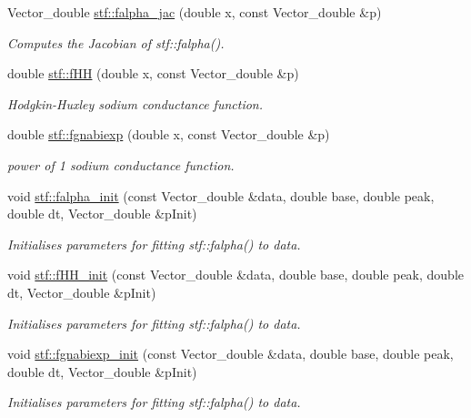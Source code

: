 \begin{DoxyCompactItemize}
Vector\_\-double \hyperlink{group__stfgen_ga8b22dedbea54a0994d9b41d5c03d0459}{stf::falpha\_\-jac} (double x, const Vector\_\-double \&p)
\begin{DoxyCompactList}\small\item\em Computes the Jacobian of stf::falpha(). \item\end{DoxyCompactList}\item 
double \hyperlink{group__stfgen_ga63447f9728c486a97b390102ff325018}{stf::fHH} (double x, const Vector\_\-double \&p)
\begin{DoxyCompactList}\small\item\em Hodgkin-\/Huxley sodium conductance function. \item\end{DoxyCompactList}\item 
double \hyperlink{group__stfgen_ga6c64c923dcb8f39d644163ab0c09abbe}{stf::fgnabiexp} (double x, const Vector\_\-double \&p)
\begin{DoxyCompactList}\small\item\em power of 1 sodium conductance function. \item\end{DoxyCompactList}\item 
void \hyperlink{group__stfgen_ga47d38cf93cda965b8dc517cf5fa20ac1}{stf::falpha\_\-init} (const Vector\_\-double \&data, double base, double peak, double dt, Vector\_\-double \&pInit)
\begin{DoxyCompactList}\small\item\em Initialises parameters for fitting stf::falpha() to {\itshape data\/}. \item\end{DoxyCompactList}\item 
void \hyperlink{group__stfgen_gacaee0bf94446342456475acd827bb1f1}{stf::fHH\_\-init} (const Vector\_\-double \&data, double base, double peak, double dt, Vector\_\-double \&pInit)
\begin{DoxyCompactList}\small\item\em Initialises parameters for fitting stf::falpha() to {\itshape data\/}. \item\end{DoxyCompactList}\item 
void \hyperlink{group__stfgen_ga5454dcb2feefac399c4f5e9d7a277dd7}{stf::fgnabiexp\_\-init} (const Vector\_\-double \&data, double base, double peak, double dt, Vector\_\-double \&pInit)
\begin{DoxyCompactList}\small\item\em Initialises parameters for fitting stf::falpha() to {\itshape data\/}. \item\end{DoxyCompactList}\item 

\end{DoxyCompactItemize}
